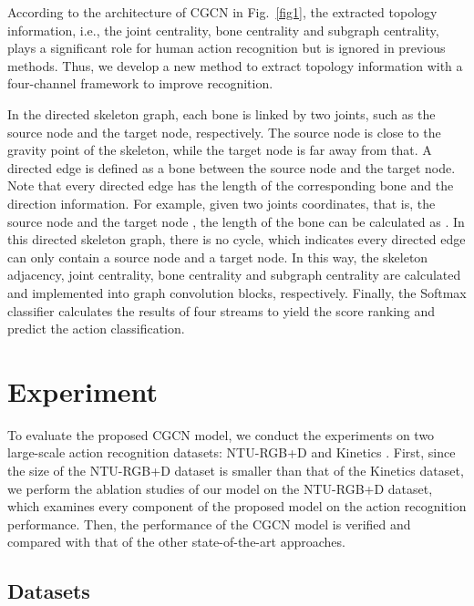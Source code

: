\documentclass[runningheads]{llncs}
\begin{document}
According to the architecture of CGCN in Fig.~\ref{fig1}, the extracted topology information, i.e., the joint centrality, bone centrality and subgraph centrality, plays a significant role for human action recognition but is ignored in previous methods. Thus, we develop a new method to extract topology information with a four-channel framework to improve recognition. 

In the directed skeleton graph, each bone is linked by two joints, such as the source node and the target node, respectively. The source node is close to the gravity point of the skeleton, while the target node is far away from that. A directed edge is defined as a bone between the source node and the target node. Note that every directed edge has the length of the corresponding bone and the direction information. For example, given two joints coordinates, that is, the source node  and the target node , the length of the bone can be calculated as . In this directed skeleton graph, there is no cycle, which indicates every directed edge can only contain a source node and a target node. In this way, the skeleton adjacency, joint centrality, bone centrality and subgraph centrality are calculated and implemented into graph convolution blocks, respectively. Finally, the Softmax classifier calculates the results of four streams to yield the score ranking and predict the action classification.


\section{Experiment}
To evaluate the proposed CGCN model, we conduct the experiments on two large-scale action recognition datasets: NTU-RGB+D \cite{Shahroudy_2016_NTURGBD,Liu_2019_NTURGBD120} and Kinetics \cite{kay2017kinetics}. First, since the size of the NTU-RGB+D dataset is smaller than that of the Kinetics dataset, we perform the ablation studies of our model on the NTU-RGB+D dataset, which examines every component of the proposed model on the action recognition performance. Then, the performance of the CGCN model is verified and compared with that of the other state-of-the-art approaches. 

\subsection{Datasets}
\end{document}
